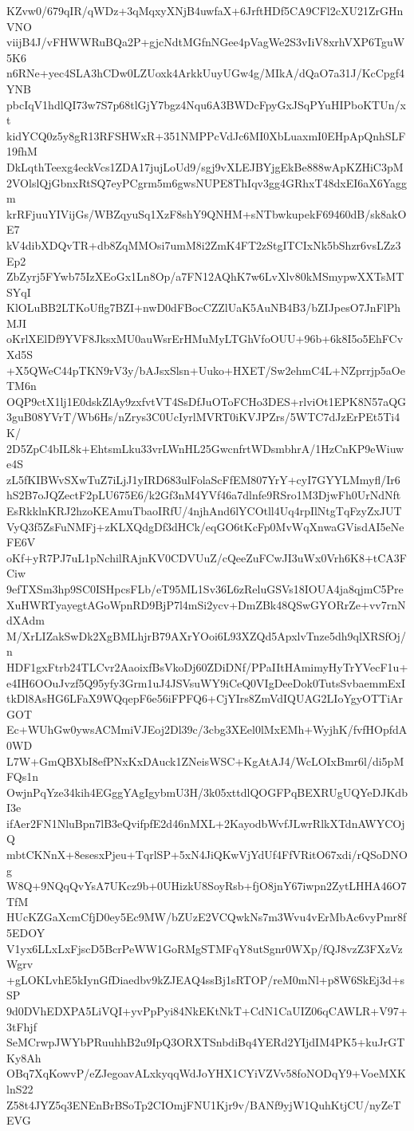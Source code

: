 KZvw0/679qIR/qWDz+3qMqxyXNjB4uwfaX+6JrftHDf5CA9CFl2cXU21ZrGHnVNO
viijB4J/vFHWWRuBQa2P+gjcNdtMGfnNGee4pVagWe2S3vIiV8xrhVXP6TguW5K6
n6RNe+yec4SLA3hCDw0LZUoxk4ArkkUuyUGw4g/MIkA/dQaO7a31J/KcCpgf4YNB
pbcIqV1hdlQI73w7S7p68tlGjY7bgz4Nqu6A3BWDcFpyGxJSqPYuHIPboKTUn/xt
kidYCQ0z5y8gR13RFSHWxR+351NMPPcVdJc6MI0XbLuaxmI0EHpApQnhSLF19fhM
DkLqthTeexg4eckVcs1ZDA17jujLoUd9/sgj9vXLEJBYjgEkBe888wApKZHiC3pM
2VOlslQjGbnxRtSQ7eyPCgrm5m6gwsNUPE8ThIqv3gg4GRhxT48dxEI6aX6Yaggm
krRFjuuYIVijGs/WBZqyuSq1XzF8shY9QNHM+sNTbwkupekF69460dB/sk8akOE7
kV4dibXDQvTR+db8ZqMMOsi7umM8i2ZmK4FT2zStgITCIxNk5bShzr6vsLZz3Ep2
ZbZyrj5FYwb75IzXEoGx1Ln8Op/a7FN12AQhK7w6LvXlv80kMSmypwXXTsMTSYqI
KlOLuBB2LTKoUflg7BZI+nwD0dFBocCZZlUaK5AuNB4B3/bZIJpesO7JnFlPhMJI
oKrlXElDf9YVF8JksxMU0auWsrErHMuMyLTGhVfoOUU+96b+6k8I5o5EhFCvXd5S
+X5QWeC44pTKN9rV3y/bAJsxSlsn+Uuko+HXET/Sw2ehmC4L+NZprrjp5aOeTM6n
OQP9ctX1lj1E0dskZlAy9zxfvtVT4SsDfJuOToFCHo3DES+rlviOt1EPK8N57aQG
3guB08YVrT/Wb6Hs/nZrys3C0UcIyrlMVRT0iKVJPZrs/5WTC7dJzErPEt5Ti4K/
2D5ZpC4bIL8k+EhtsmLku33vrLWnHL25GwcnfrtWDsmbhrA/1HzCnKP9eWiuwe4S
zL5fKIBWvSXwTuZ7iLjJ1yIRD683ulFolaScFfEM807YrY+cyI7GYYLMmyfl/Ir6
hS2B7oJQZectF2pLU675E6/k2Gf3nM4YVf46a7dlnfe9RSro1M3DjwFh0UrNdNft
EsRkklnKRJ2hzoKEAmuTbaoIRfU/4njhAnd6lYCOtll4Uq4rpIlNtgTqFzyZxJUT
VyQ3f5ZsFuNMFj+zKLXQdgDf3dHCk/eqGO6tKcFp0MvWqXnwaGVisdAI5eNeFE6V
oKf+yR7PJ7uL1pNchilRAjnKV0CDVUuZ/cQeeZuFCwJI3uWx0Vrh6K8+tCA3FCiw
9efTXSm3hp9SC0ISHpcsFLb/eT95ML1Sv36L6zReluGSVs18IOUA4ja8qjmC5Pre
XuHWRTyayegtAGoWpnRD9BjP7l4mSi2ycv+DmZBk48QSwGYORrZe+vv7rnNdXAdm
M/XrLIZakSwDk2XgBMLhjrB79AXrYOoi6L93XZQd5ApxlvTnze5dh9qlXRSfOj/n
HDF1gxFtrb24TLCvr2AaoixfBsVkoDj60ZDiDNf/PPaIItHAmimyHyTrYVecF1u+
e4IH6OOuJvzf5Q95yfy3Grm1uJ4JSVsuWY9iCeQ0VIgDeeDok0TutsSvbaemmExI
tkDl8AsHG6LFaX9WQqepF6e56iFPFQ6+CjYIrs8ZmVdIQUAG2LIoYgyOTTiArGOT
Ec+WUhGw0ywsACMmiVJEoj2Dl39c/3cbg3XEel0lMxEMh+WyjhK/fvfHOpfdA0WD
L7W+GmQBXbI8efPNxKxDAuck1ZNeisWSC+KgAtAJ4/WcLOIxBmr6l/di5pMFQs1n
OwjnPqYze34kih4EGggYAgIgybmU3H/3k05xttdlQOGFPqBEXRUgUQYeDJKdbI3e
ifAer2FN1NluBpn7lB3eQvifpfE2d46nMXL+2KayodbWvfJLwrRlkXTdnAWYCOjQ
mbtCKNnX+8esesxPjeu+TqrlSP+5xN4JiQKwVjYdUf4FfVRitO67xdi/rQSoDNOg
W8Q+9NQqQvYsA7UKcz9b+0UHizkU8SoyRsb+fjO8jnY67iwpn2ZytLHHA46O7TfM
HUcKZGaXcmCfjD0ey5Ec9MW/bZUzE2VCQwkNs7m3Wvu4vErMbAc6vyPmr8f5EDOY
V1yx6LLxLxFjscD5BcrPeWW1GoRMgSTMFqY8utSgnr0WXp/fQJ8vzZ3FXzVzWgrv
+gLOKLvhE5kIynGfDiaedbv9kZJEAQ4ssBj1sRTOP/reM0mNl+p8W6SkEj3d+sSP
9d0DVhEDXPA5LiVQI+yvPpPyi84NkEKtNkT+CdN1CaUIZ06qCAWLR+V97+3tFhjf
SeMCrwpJWYbPRuuhhB2u9IpQ3ORXTSnbdiBq4YERd2YIjdIM4PK5+kuJrGTKy8Ah
OBq7XqKowvP/eZJegoavALxkyqqWdJoYHX1CYiVZVv58foNODqY9+VoeMXKlnS22
Z58t4JYZ5q3ENEnBrBSoTp2CIOmjFNU1Kjr9v/BANf9yjW1QuhKtjCU/nyZeTEVG
